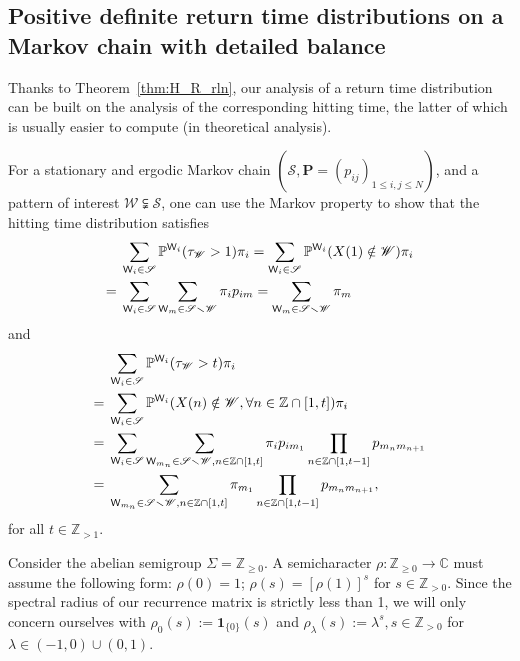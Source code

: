 \documentclass[10pt,journal,compsoc]{IEEEtran}
\begin{document}
\subsection{Positive definite return time distributions  on a Markov chain with detailed balance\label{app:rec_time}}Thanks to Theorem~\ref{thm:H_R_rln}, our analysis of a return time distribution can be built on the analysis of the corresponding hitting time, the latter of which is usually easier to compute (in theoretical analysis).

For a   stationary and ergodic Markov chain $ (\mathscr S,\mathbf P=(p_{ij})_{1\leq  i, j\leq N})$, and a pattern of interest  $ \mathscr W\subsetneqq\mathscr S$, one can use the Markov property to show that the hitting time distribution satisfies\begin{align}
&\sum_{\mathsf W_{i}\in\mathscr S}\mathbb P^{\mathsf W_i}(\tau_{\mathscr W}>1) \pi_i=\sum_{\mathsf W_{i}\in\mathscr S}\mathbb P^{\mathsf W_i}(X(1)\notin\mathscr W) \pi_i\notag\\={}&\sum_{\mathsf W_{i}\in\mathscr S}\sum_{\mathsf W_{m}\in\mathscr S\smallsetminus\mathscr W}\pi_ip_{i m}=\sum_{\mathsf W_{m}\in\mathscr S\smallsetminus\mathscr W}\pi_{ m}\label{eq:Markov_hitting_1}
\end{align}and {\allowdisplaybreaks\begin{align}&
\sum_{\mathsf W_{i}\in\mathscr S}\mathbb P^{\mathsf W_i}(\tau_{\mathscr W}>t) \pi_i\notag\\={}&\sum_{\mathsf W_{i}\in\mathscr S}\mathbb P^{\mathsf W_i}(X(n)\notin\mathscr W,\forall n\in\mathbb Z\cap[1,t]) \pi_i\notag\\={}&\sum_{\mathsf W_{i}\in\mathscr S}\sum_{\mathsf W_{m_n}\in\mathscr S\smallsetminus\mathscr W, n\in\mathbb Z\cap[1,t]}\pi_ip_{i m_1} \prod_{n\in\mathbb Z\cap[1,t-1]} p_{{m_{\vphantom{1}n}}{m_{n+1}}}\notag\\={}&\sum_{\mathsf W_{m_n}\in\mathscr S\smallsetminus\mathscr W, n\in\mathbb Z\cap[1,t]}\pi_{m_1}\prod_{n\in\mathbb Z\cap[1,t-1]} p_{{m_{\vphantom{1}n}}{m_{n+1}}},\label{eq:Markov_hitting_rec}
\end{align}}for all $ t\in\mathbb Z_{>1}$.

Consider the abelian semigroup $\Sigma=\mathbb  Z_{\geq0}$. A semi\-character \cite[p.~92, Definition 2.1]{GTM100} $ \rho:\mathbb Z_{\geq0}\longrightarrow\mathbb C$       must assume the following form: $ \rho(0)=1$; $\rho(s)=[\rho(1)]^s$ for  $s\in\mathbb Z_{>0}$. Since the spectral radius of our recurrence matrix is strictly less than  1, we will only concern ourselves with $ \rho_0(s):=\mathbf1_{\{0\}}(s)$ and $ \rho_\lambda(s):=\lambda^s,s\in\mathbb Z_{>0}$ for $ \lambda\in(-1,0)\cup(0,1)$.
\end{document}
